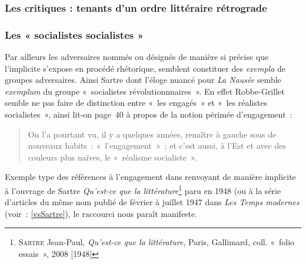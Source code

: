 \documentclass[12pt, a4paper]{article}
\begin{document}
\subsubsection{Les critiques : tenants d'un ordre littéraire rétrograde}

\subsubsection{Les « socialistes socialistes »}



Par ailleurs les adversaires nommés ou désignés de manière si précise que l'implicite s'expose en procédé rhétorique, semblent constituer des \textit{exempla} de groupes adversaires. Ainsi Sartre dont l'éloge nuancé pour \textit{La Nausée} semble \textit{exemplum} du groupe «~socialistes révolutionnnaires~». En effet Robbe-Grillet semble ne pas faire de distinction entre «~les engagés~» et «~les réalistes socialistes~», ainsi lit-on page~40 à propos de la notion périmée d'engagement~:
\begin{quote}
    On l’a pourtant vu, il y a quelques années, renaître à gauche sous de nouveaux habits~: «~l’engagement~»~; et c’est aussi, à l’Est et avec des couleurs plus naïves, le «~réalisme socialiste~».
\end{quote}
Exemple type des références à l'engagement dans \punr{} renvoyant de manière implicite à l'ouvrage de Sartre \textit{Qu'est-ce que la littérature}\footnote{\textsc{Sartre} Jean-Paul, \textit{Qu'est-ce que la littérature}, Paris, Gallimard, coll. «~folio essais~», 2008 [1948]} paru en 1948 (ou à la série d'articles du même nom publié de février à juillet 1947 dans \textit{Les Temps modernes} (voir~: \ref{vsSartre}), le raccourci nous paraît manifeste.
\end{document}
